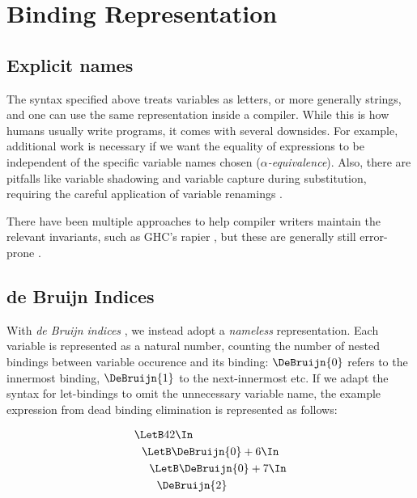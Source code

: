 \chapter{Binding Representation}
\label{ch:binding-representation}

\section{Explicit names}
\label{sec:binding-representation-names}
The syntax specified above treats variables as letters, or more generally strings,
and one can use the same representation inside a compiler.
While this is how humans usually write programs, it comes with several downsides.
For example, additional work is necessary
if we want the equality of expressions to be independent of the specific variable names chosen
(\emph{$\alpha$-equivalence}).
Also, there are pitfalls like variable shadowing and variable capture during substitution,
requiring the careful application of variable renamings
\cite{Barendregt1985LambdaCalculus}.

There have been multiple approaches to help compiler writers maintain the relevant invariants,
such as GHC's rapier \cite{Jones2002GHCInliner},
but these are generally still error-prone
\cite{Maclaurin2022Foil}.

\section{de Bruijn Indices}
\label{sec:binding-representation-de-bruijn}

With \emph{de Bruijn indices}
\cite{DeBruijn1972NamelessIndices},
we instead adopt a \emph{nameless} representation.
Each variable is represented as a natural number,
counting the number of nested bindings between variable occurence and its binding:
$\DeBruijn{0}$ refers to the innermost binding, $\DeBruijn{1}$ to the next-innermost etc.
If we adapt the syntax for let-bindings to omit the unnecessary variable name,
the example expression from dead binding elimination is represented as follows:

\begin{align*}
  &\LetB 42 \In                       \\
  &\ \ \LetB \DeBruijn{0} + 6 \In     \\
  &\ \ \ \ \LetB \DeBruijn{0} + 7 \In \\
  &\ \ \ \ \ \ \DeBruijn{2}
\end{align*}


